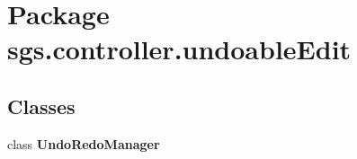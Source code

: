 \section{Package sgs.\-controller.\-undoable\-Edit}
\label{namespacesgs_1_1controller_1_1undoable_edit}
\subsection*{Classes}
\begin{DoxyCompactItemize}
\item 
class {\bf Undo\-Redo\-Manager}
\end{DoxyCompactItemize}
